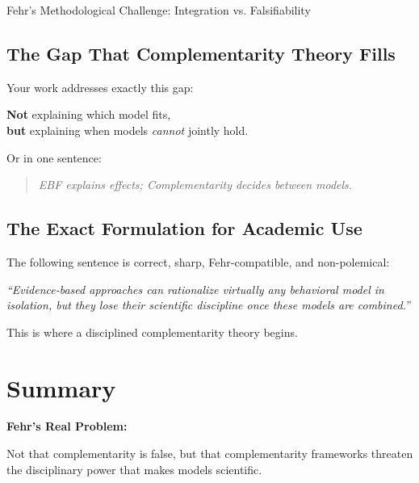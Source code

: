 \begin{chapter}{Fehr's Methodological Challenge: Integration vs. Falsifiability}
\subsection{The Gap That Complementarity Theory Fills}

Your work addresses exactly this gap:

\begin{tcolorbox}[colback=blue!5!white,colframe=blue!75!black]
\textbf{Not} explaining which model fits,\\
\textbf{but} explaining when models \textit{cannot} jointly hold.
\end{tcolorbox}

Or in one sentence:

\begin{quote}
\large
\textit{EBF explains effects; Complementarity decides between models.}
\end{quote}

\subsection{The Exact Formulation for Academic Use}

The following sentence is correct, sharp, Fehr-compatible, and non-polemical:

\begin{tcolorbox}[colback=green!5!white,colframe=green!75!black]
\begin{center}
\large
\textit{``Evidence-based approaches can rationalize virtually any behavioral model in isolation, but they lose their scientific discipline once these models are combined.''}
\end{center}
\end{tcolorbox}

This is where a disciplined complementarity theory begins.


\section{Summary}
\label{sec:summary}

\begin{tcolorbox}[colback=blue!5!white,colframe=blue!75!black,title=\textbf{Concluding Statement}]

\textbf{Fehr's Real Problem:}

Not that complementarity is false, but that complementarity frameworks threaten the disciplinary power that makes models scientific.


\end{tcolorbox}
\end{chapter}
